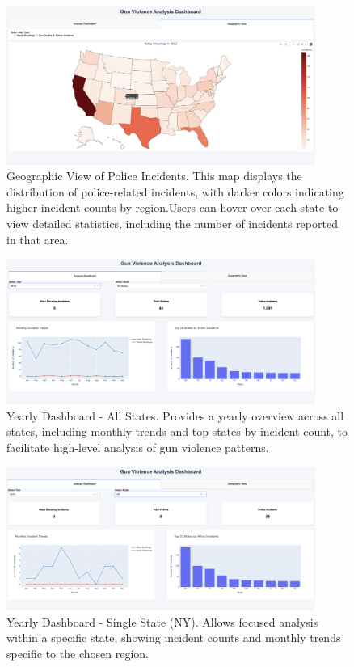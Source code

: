 \documentclass{article}
\begin{document}
\begin{figure}[H]
    \centering
    \includegraphics[width=0.9\textwidth]{policeIncedentGeo.png}
    \caption{Geographic View of Police Incidents. This map displays the distribution of police-related incidents, with darker colors indicating higher incident counts by region.Users can hover over each state to view detailed statistics, including the number of incidents reported in that area.}
    \label{fig:police_incidents}
\end{figure}

\begin{figure}[H]
    \centering
    \includegraphics[width=0.9\textwidth]{AllStateView.png}
    \caption{Yearly Dashboard - All States. Provides a yearly overview across all states, including monthly trends and top states by incident count, to facilitate high-level analysis of gun violence patterns.}
    \label{fig:yearly_all_states}
\end{figure}

\begin{figure}[H]
    \centering
    \includegraphics[width=0.9\textwidth]{NyStateView.png}
    \caption{Yearly Dashboard - Single State (NY). Allows focused analysis within a specific state, showing incident counts and monthly trends specific to the chosen region.}
    \label{fig:yearly_single_state}
\end{figure}
\end{document}
